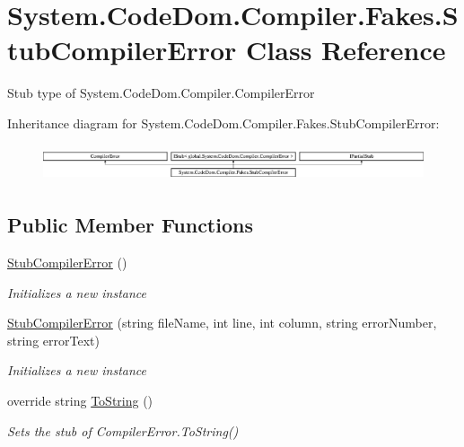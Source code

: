 \hypertarget{class_system_1_1_code_dom_1_1_compiler_1_1_fakes_1_1_stub_compiler_error}{\section{System.\-Code\-Dom.\-Compiler.\-Fakes.\-Stub\-Compiler\-Error Class Reference}
\label{class_system_1_1_code_dom_1_1_compiler_1_1_fakes_1_1_stub_compiler_error}
}


Stub type of System.\-Code\-Dom.\-Compiler.\-Compiler\-Error 


Inheritance diagram for System.\-Code\-Dom.\-Compiler.\-Fakes.\-Stub\-Compiler\-Error\-:\begin{figure}[H]
\begin{center}
\leavevmode
\includegraphics[height=1.075889cm]{class_system_1_1_code_dom_1_1_compiler_1_1_fakes_1_1_stub_compiler_error}
\end{center}
\end{figure}
\subsection*{Public Member Functions}
\begin{DoxyCompactItemize}
\item 
\hyperlink{class_system_1_1_code_dom_1_1_compiler_1_1_fakes_1_1_stub_compiler_error_a889da9aa9478b52b86a97853247245c4}{Stub\-Compiler\-Error} ()
\begin{DoxyCompactList}\small\item\em Initializes a new instance\end{DoxyCompactList}\item 
\hyperlink{class_system_1_1_code_dom_1_1_compiler_1_1_fakes_1_1_stub_compiler_error_ab2fc14e05009aa5d105e3226ec8e4535}{Stub\-Compiler\-Error} (string file\-Name, int line, int column, string error\-Number, string error\-Text)
\begin{DoxyCompactList}\small\item\em Initializes a new instance\end{DoxyCompactList}\item 
override string \hyperlink{class_system_1_1_code_dom_1_1_compiler_1_1_fakes_1_1_stub_compiler_error_a7ccbc71be21873305e02f2b0197f3a5b}{To\-String} ()
\begin{DoxyCompactList}\small\item\em Sets the stub of Compiler\-Error.\-To\-String()\end{DoxyCompactList}\end{DoxyCompactItemize}
